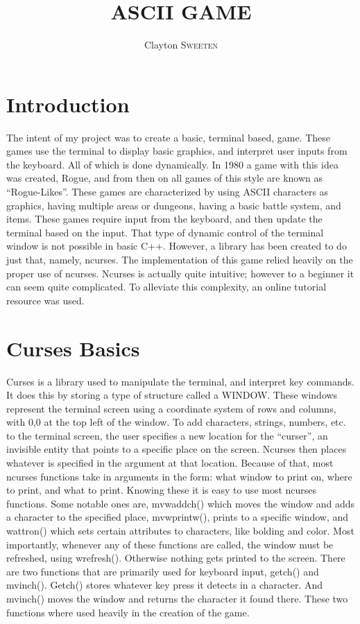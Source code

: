 \documentclass[11pt]{article}
\title
{\LARGE{ASCII GAME}}
\author{\LARGE{Clayton \textsc{Sweeten}}}
\begin{document}
\maketitle

\section{Introduction}
The intent of my project was to create a basic, terminal based, game.  These games use the terminal to display basic graphics, and interpret user inputs from the keyboard.  All of which is done dynamically.  In 1980 a game with this idea was created, Rogue, and from then on all games of this style are known as “Rogue-Likes”.  These games are characterized by using ASCII characters as graphics, having multiple areas or dungeons, having a basic battle system, and items.  These games require input from the keyboard, and then update the terminal based on the input.  That type of dynamic control of the terminal window is not possible in basic C++.  However, a library has been created to do just that, namely, ncurses.  The implementation of this game relied heavily on the proper use of ncurses.  Ncurses is actually quite intuitive; however to a beginner it can seem quite complicated.  To alleviate this complexity, an online tutorial resource was used.   
\section{Curses Basics}
Curses is a library used to manipulate the terminal, and interpret key commands.  It does this by storing a type of structure called a WINDOW.  These windows represent the terminal screen using a coordinate system of rows and columns, with 0,0 at the top left of the window.  To add characters, strings, numbers, etc. to the terminal screen, the user specifies a new location for the “curser”, an invisible entity that points to a specific place on the screen.  Ncurses then places whatever is specified in the argument at that location.  Because of that, most ncurses functions take in arguments in the form: what window to print on, where to print, and what to print.  Knowing these it is easy to use most ncurses functions.  Some notable ones are, mvwaddch() which moves the window and adds a character to the specified place, mvwprintw(), prints to a specific window, and wattron() which sets certain attributes to characters, like bolding and color.  Most importantly, whenever any of these functions are called, the window must be refreshed, using wrefresh().  Otherwise nothing gets printed to the screen. There are two functions that are primarily used for keyboard input, getch() and mvinch().  Getch() stores whatever key press it detects in a character.  And mvinch() moves the window and returns the character it found there.  These two functions where used heavily in the creation of the game.
\end{document}
